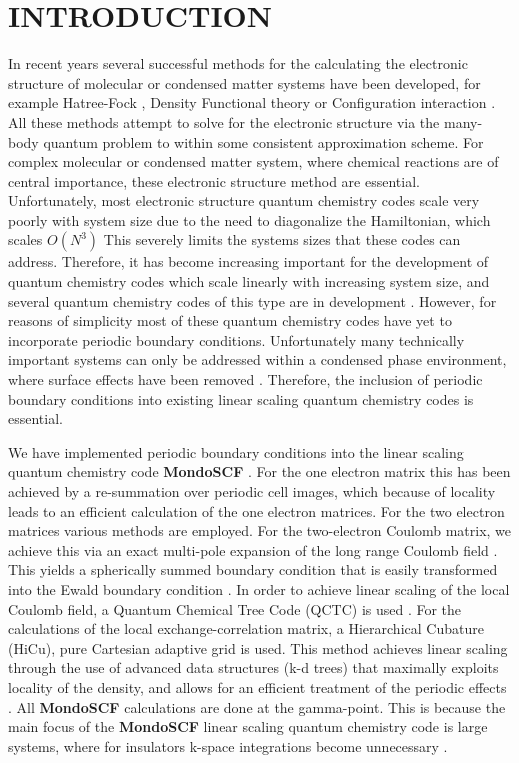 \commentoutA{\documentclass[prb,aps,twocolumn,showpacs,twocolumngrid,superbib]{revtex4}}
\begin{document}
\section{INTRODUCTION}
In recent years several successful methods for the calculating the electronic structure of
molecular or condensed matter systems have been developed,
for example Hatree-Fock \cite{slater,CRoothaan51}, Density Functional theory 
\cite{hohen,KohnSham65} or Configuration interaction \cite{Choudhury79}. 
All these methods attempt to solve for the electronic structure via
the many-body quantum problem to within some consistent approximation scheme.
For complex molecular or condensed matter 
system, where chemical reactions are of central importance, these electronic structure
method are essential. Unfortunately, most electronic structure quantum chemistry codes
scale very poorly with system size due to the need to diagonalize the Hamiltonian,
which scales $O(N^3)$ 
%
%
This severely limits the systems sizes 
that these codes can address. Therefore, it has become increasing important for
the development of quantum chemistry codes which scale linearly with increasing 
system size, and several quantum chemistry codes of this type are in 
development 
\cite{Goedecker94,Challacombe96,Canning96,Briggs96,EHernandez96,Scuseria99,ANiklasson02B}. 
However, for reasons of simplicity most of these quantum 
chemistry codes have yet to incorporate periodic boundary conditions.
Unfortunately many
technically important systems can only be addressed within a condensed phase environment,
where surface effects have been removed \cite{Allen90}. Therefore, the inclusion of 
periodic boundary conditions into existing linear scaling quantum chemistry
codes is essential. 

We have implemented periodic boundary conditions into the linear scaling
quantum chemistry code \textbf{MondoSCF} 
\cite{Challacombe96,Challacombe97,Challacombe99}.
For the one electron matrix this has been achieved by a re-summation
over periodic cell images, which because of locality leads to an efficient
calculation of the one electron matrices. For the two electron matrices
various methods are employed. For the two-electron Coulomb matrix,
we achieve this via an exact multi-pole expansion of the long range
Coulomb field \cite{White94,Challacombe97b}. This yields a spherically
summed boundary condition that is easily transformed into the Ewald boundary
condition \cite{Redlack72,Redlack75}. In order to achieve linear
scaling of the local Coulomb field, a Quantum Chemical Tree Code (QCTC)
is used \cite{WarSal93,WarSal95,Salmon:93,Challacombe96A}. For the calculations of the 
local exchange-correlation matrix, a Hierarchical Cubature (HiCu), pure 
Cartesian adaptive grid
is used. This method achieves linear scaling through the use of advanced
data structures (k-d trees) that maximally exploits locality of the
density, and allows for an efficient treatment of the periodic effects
\cite{Bentley79}. All \textbf{MondoSCF} calculations are done at the gamma-point.
This is because the main focus of the \textbf{MondoSCF} linear scaling quantum chemistry
code is large systems, where for insulators k-space integrations become unnecessary 
\cite{Nunes94}.
\end{document}
